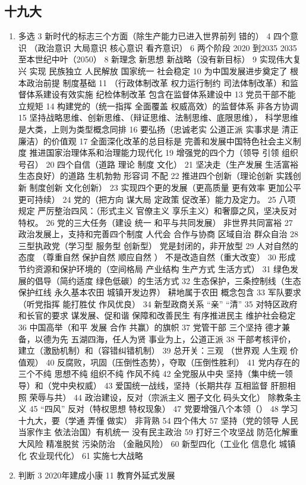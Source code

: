 \documentclass[cyan]{elegantnote}
\begin{document}
\subsection{十九大}
\label{sec:orgaccfdbf}
\begin{enumerate}
\item 多选
\label{sec:org8f58157}
3 新时代的标志三个方面（除生产能力已进入世界前列 错的）
4 四个意识 （政治意识 大局意识 核心意识 看齐意识）
6 两个阶段
2020 到2035
2035 至本世纪中叶（2050）
8  新理念 新思想 新战略（没有新目标）
9 实现伟大复兴 实现
民族独立 人民解放 国家统一 社会稳定
10 为中国发展进步奠定了
根本政治前提
制度基础
11 （行政体制改革 权力运行制约 司法体制改革）和监督体系建设有效实施
纪检体制改革 包含在监督体系建设中
13 党员干部不能立规矩
14 构建党的（统一指挥 全面覆盖 权威高效）的监督体系
非各方协调
15 坚持战略思维、创新思维、（辩证思维、法制思维、底限思维），
科学思维是大类，上则为类型概念同排
16 要弘扬（忠诚老实 公道正派 实事求是 清正廉洁）的价值观
17 全面深化改革的总目标是
完善和发展中国特色社会主义制度
推进国家治理体系和治理能力现代化
19 增强党的四个力（领导 引领 组织 号召）
20 四个自信（道路 理论 制度 文化）
21 坚决走（生产发展 生活富裕 生态良好）的道路
生机勃勃 形容词 不配
22 推进四个创新（理论创新 实践创新 制度创新 文化创新）
23 实现四个更的发展（更高质量 更有效率 更加公平 更可持续）
24 党的（把方向 谋大局 定政策 促改革）能力及定力。
25 八项规定 严厉整治四风：（形式主义 官僚主义 享乐主义）和奢靡之风，坚决反对特权。
26 党的三大任务（建设 统一 和平与共同发展）
非世界共同富裕
27 政治发展上，支持和完善四个制度
人代会 合作与协商 区域自治 群众自治
28 三型执政党（学习型 服务型 创新型）
党是封闭的，非开放型
29 人对自然的态度 （尊重自然 保护自然 顺应自然 ）
不是改造自然（重大改变）
30 形成节约资源和保护环境的（空间格局 产业结构 生产方式 生活方式）
31 绿色发展的倡导（简约适度 绿色低碳）的生活方式
32 生态保护，三条控制线（生态保护红线 永久基本农田 城镇开发边界）
耕地属于农田 概念包含
33 军队要求（听党指挥 能打胜仗 作风优良）
34 新型政商关系 “亲” “清”
35 对特区政府和长官的要求
谋发展、促和谐
保障和改善民生
有序推进民主
维护社会稳定
36 中国高举（和平 发展 合作 共赢）的旗帜
37 党管干部 三个坚持
德才兼备，以德为先
五湖四海，任人为贤
事业为上，公道正派
38 干部考核评价，建立（激励机制）和（容错纠错机制）
39 总开关：三观 （世界观 人生观 价值观）
40 反腐败，巩固（压倒性态势），夺取（压倒性胜利）
41 党内存在的三个不纯
思想不纯 组织不纯 作风不纯
42 全党服从中央 坚持（集中统一领导）和（党中央权威）
43 爱国统一战线，坚持（长期共存 互相监督 肝胆相照 荣辱与共）
44 政治建设，反对（宗派主义 圈子文化 码头文化）
除教条主义
45 “四风” 反对（特权思想 特权现象）
47 党要增强八个本领（）
48 学习十九大，要（学通 弄懂 做实）
非背熟
54 四个伟大
57 坚持（党的领导 人民当家作主 依法治国）有机统一
没有民主政治
59 打好三个攻坚战
防范化解重大风险
精准脱贫
污染防治
（金融风险）
60 新型四化（工业化 信息化 城镇化 农业现代化）
61 实施七大战略
\item 判断
\label{sec:org8836251}
3 2020年建成小康
11 教育外延式发展
\end{enumerate}
\end{document}
